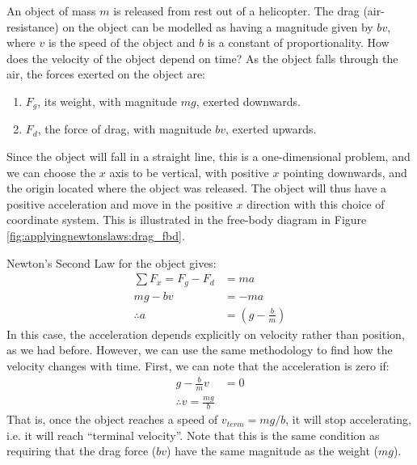 \begin{example}{An object of mass $m$ is released from rest out of a helicopter. The drag (air-resistance) on the object can be modelled as having a magnitude given by $bv$, where $v$ is the speed of the object and $b$ is a constant of proportionality. How does the velocity of the object depend on time?}
\label{ex:applyingnewtonslaws:drag}
As the object falls through the air, the forces exerted on the object are:
\begin{enumerate}
\item $F_g$, its weight, with magnitude $mg$, exerted downwards.
\item $F_d$, the force of drag, with magnitude $bv$, exerted upwards. 
\end{enumerate}
Since the object will fall in a straight line, this is a one-dimensional problem, and we can choose the $x$ axis to be vertical, with positive $x$ pointing downwards, and the origin located where the object was released. The object will thus have a positive acceleration and move in the positive $x$ direction with this choice of coordinate system. This is illustrated in the free-body diagram in Figure \ref{fig:applyingnewtonslaws:drag_fbd}.

Newton's Second Law for the object gives:
\begin{align*}
\sum F_x = F_g - F_d &= ma\\
mg - bv &= -ma\\
\therefore a &= \left (g-\frac{b}{m} \right)
\end{align*}
In this case, the acceleration depends explicitly on velocity rather than position, as we had before. However, we can use the same methodology to find how the velocity changes with time. First, we can note that the acceleration is zero if:
\begin{align*}
g-\frac{b}{m}v &=0\\
\therefore v = \frac{mg}{b}
\end{align*}
That is, once the object reaches a speed of $v_{term}=mg/b$, it will stop accelerating, i.e. it will reach ``terminal velocity''. Note that this is the same condition as requiring that the drag force ($bv$) have the same magnitude as the weight ($mg$).


\end{example}

